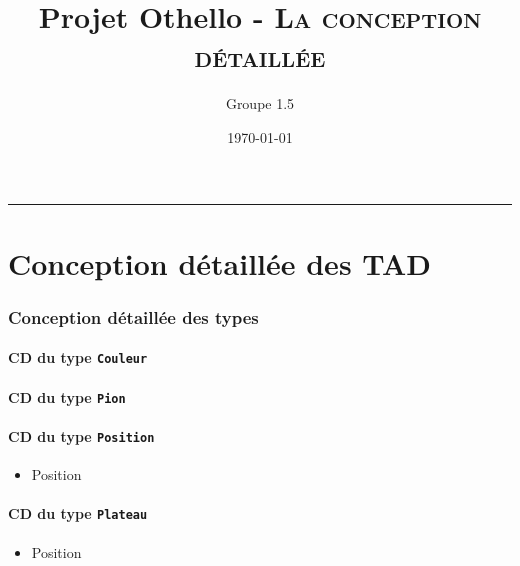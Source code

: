 \documentclass[11pt]{article}
\title{Projet Othello - \textsc{La conception détaillée}}
\author{Groupe 1.5}
\date{\today}
\begin{document}
\maketitle
\noindent\rule{\textwidth}{1.3pt}

\renewcommand{\tt}[1]{\og \texttt{#1} \fg}

\part{Conception détaillée des TAD}

\section{Conception détaillée des types}

\subsection{CD du type \tt{Couleur}}
\begin{itemize}
\end{itemize}

\subsection{CD du type \tt{Pion}}
\begin{itemize}
\end{itemize}

\subsection{CD du type \tt{Position}}
\begin{itemize}
\item
\begin{algorithme}
\begin{enregistrement}{Position}
\end{enregistrement}
\end{algorithme}
\end{itemize}

\subsection{CD du type \tt{Plateau}}
\begin{itemize}
\item
\begin{algorithme}
\begin{enregistrement}{Position}
\end{enregistrement}
\end{algorithme}
\end{itemize}
\end{document}
